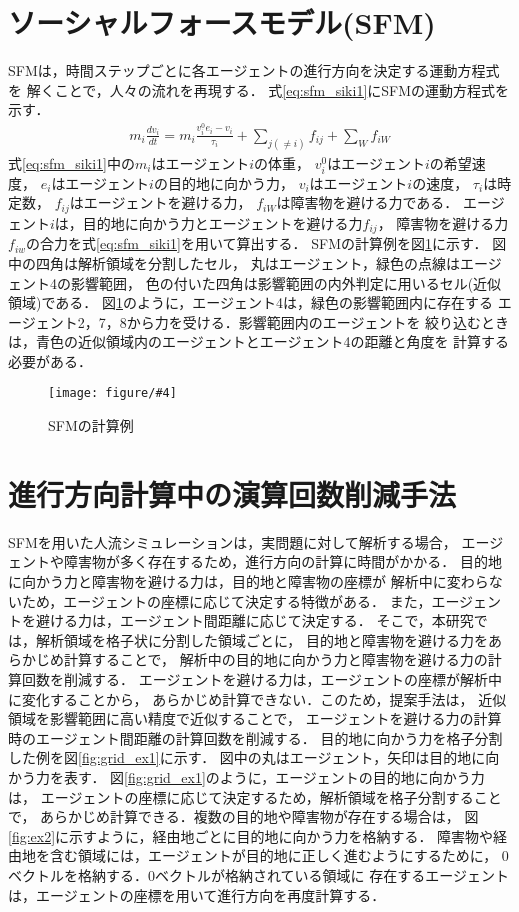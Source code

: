 \documentclass{maelab_y}
\newcommand{\figtb}[5]{ %
\begin{figure}[hbtp]
  \begin{center}
    \texttt{[image: figure/\#4]}
    \caption{#1}
    \label{fig:#5}
  \end{center}
\end{figure}
}%
\newcommand{\分類条件}{%
\begin{table}[t]
\begin{center}
\caption{進行方向を分類する条件}
\ecaption{Classification condition of moving direction $e_{i}$.}
\label{tb:hantei_jouken}
\begin{tabular}{c|c|c|c|c}
\hline \hline
			& 右 & 左 & 上 & 下 \\ \hline
パターン2   & $\frac{1}{\sqrt{2}} < e_x \leq 1  $
		    & $ -1 \leq e_x < \frac{-1}{\sqrt{2}}$ 
		    & $ \frac{-1}{\sqrt{2}} < e_x < \frac{1}{\sqrt{2}} $ 
		    & $ \frac{-1}{2} < e_x < \frac{1}{2} $ \\
パターン3   & $\frac{-1}{2} < e_y < \frac{1}{2} $ 
		    & $\frac{-1}{2} < e_y < \frac{1}{2} $
            & $ \frac{1}{\sqrt{2}} < e_y \leq 1$
		    & $ -1 \leq e_y < \frac{-1}{\sqrt{2}} $ \\
\hline
\multirow{2}{*}{パターン4}   
			& $R_x \geq A_x$ & $R_x < A_x$ & $R_y \geq A_y$ & $R_y < A_y $ \\
	        &  $L_x \geq A_x$ & $L_x < A_x$ & $L_y \geq A_y$ & $L_y < A_y$ \\
\hline
\multirow{2}{*}{パターン5}   
 			& $R_x \geq x_1$ & $R_x < x_2$ & $R_y \geq y_1$ & $R_y < y_2 $ \\
			& $L_x \geq x_1$ & $L_x < x_2$ & $L_y \geq y_1$ & $L_y < y_2 $ \\
\hline
パターン6   & $ \cos(\frac{1}{2}\theta_{view}) \leq  e_y $ 
			& $ e_y \leq -\cos(\frac{1}{2}\theta_{view})$ 
			& $ \sin(\frac{1}{2}(\pi - \theta_{view})) \leq e_x $ 
			& $ e_x \leq \sin(\frac{1}{2}(\pi - \theta_{view}))  $ \\
\hline
\end{tabular}
\end{center}
\end{table}}%
\newcommand{\距離計算new}{%
  \begin{table}[hbtp]
    \begin{center}
    \caption{エージェント間距離の計算回数[$10^{10}$回]}
    \label{tab:my-table}
    \begin{tabular}{c|llllll}
    \hline \hline
    \multirow{2}{*}{人数}   & \multicolumn{6}{c}{パターン}                                                                                                                                                             \\ \cline{2-7} 
                          & \multicolumn{1}{c|}{1}    & \multicolumn{1}{c|}{2}               & \multicolumn{1}{c|}{3}      & \multicolumn{1}{c|}{4}      & \multicolumn{1}{c|}{5}      & \multicolumn{1}{c}{6}    \\ \hline
    \multirow{2}{*}{3000} & \multicolumn{1}{r|}{5.1}  & \multicolumn{1}{r|}{\textbf{3.9}}    & \multicolumn{1}{r|}{4.0}    & \multicolumn{1}{r|}{4.4}    & \multicolumn{1}{r|}{4.1}    & \multicolumn{1}{r}{4.4}  \\
                          & \multicolumn{1}{l|}{}     & \multicolumn{1}{l|}{\textbf{(24\%)}} & \multicolumn{1}{l|}{(23\%)} & \multicolumn{1}{l|}{(15\%)} & \multicolumn{1}{l|}{(21\%)} & (15\%)                   \\ \hline
    \multirow{2}{*}{5000} & \multicolumn{1}{r|}{14.4} & \multicolumn{1}{r|}{\textbf{10.9}}   & \multicolumn{1}{r|}{11.1}   & \multicolumn{1}{r|}{12.2}   & \multicolumn{1}{r|}{11.4}   & \multicolumn{1}{r}{12.2} \\
                          & \multicolumn{1}{l|}{}     & \multicolumn{1}{l|}{\textbf{(24\%)}} & \multicolumn{1}{l|}{(23\%)} & \multicolumn{1}{l|}{(15\%)} & \multicolumn{1}{l|}{(21\%)} & (15\%)                   \\ \hline
    \multirow{2}{*}{7500} & \multicolumn{1}{r|}{33.1} & \multicolumn{1}{r|}{\textbf{25.2}}   & \multicolumn{1}{r|}{25.8}   & \multicolumn{1}{r|}{28.3}   & \multicolumn{1}{r|}{26.7}   & \multicolumn{1}{r}{28.3} \\
                          & \multicolumn{1}{l|}{}     & \multicolumn{1}{l|}{\textbf{(24\%)}} & \multicolumn{1}{l|}{(22\%)} & \multicolumn{1}{l|}{(15\%)} & \multicolumn{1}{l|}{(20\%)} & (15\%)                   \\ \hline
    \end{tabular}
    \end{center}
    \end{table}
}%
\newcommand{\粒子数}{%
\begin{table}[hbtp]
  \begin{center}
    \caption{各配置の詳細}
    \label{tb:haichi_para}
    \begin{tabular}{c|c|c}
      \hline \hline
      & 教室 & 演習室 \\ \hline 
      エージェント数[人] & 96 & 204 \\ \hline
      壁粒子数[個] & 1037 & 1454\\ \hline
      経由地数[個] & 12   & 26 \\ \hline
      解析領域 & $50m\times50m$ & $50m\times50m$ \\ \hline
    \end{tabular}
  \end{center}
\end{table}
}%
\newcommand{\評価環境}{%
\begin{table}[hbtp]
  \begin{center}
    \caption{各配置の詳細}
    \label{tb:haichi_para}
    \begin{tabular}{c|c|c}
      \hline \hline
                 & マシン1                & マシン2 \\ \hline 
      CPU        & Intel Xeon E5-2687W & Intel Xeon E5-2667W \\ \hline
      メモリ     & 64GB                   & 64GB \\ \hline
      OS         & Linux 4.12.9            & Linux 6.5.8 \\ \hline
      コンパイラ & gcc 7.2.0             & gcc 13.2.0 \\ \hline
    \end{tabular}
  \end{center}
\end{table}
}%
\begin{document}
\section{ソーシャルフォースモデル(SFM)}
SFMは，時間ステップごとに各エージェントの進行方向を決定する運動方程式を
解くことで，人々の流れを再現する．
式\eqref{eq:sfm_siki1}にSFMの運動方程式を示す．
%
\begin{align} \label{eq:sfm_siki1}
  m_i \frac{dv_i}{dt} = m_i \frac{v_i^0 e_i - v_i}{\tau_i}
  +\sum_{j(\neq i)}f_{ij}+\sum_{W}f_{iW}
\end{align}
%
式\eqref{eq:sfm_siki1}中の$m_i$はエージェント$i$の体重，
$v_i^0$はエージェント$i$の希望速度，
$e_i$はエージェント$i$の目的地に向かう力，
$v_i$はエージェント$i$の速度，
$\tau_i$は時定数，
$f_{ij}$はエージェントを避ける力，
$f_{iW}$は障害物を避ける力である．
エージェント$i$は，目的地に向かう力とエージェントを避ける力$f_{ij}$，
障害物を避ける力$f_{iw}$の合力を式\eqref{eq:sfm_siki1}を用いて算出する．
SFMの計算例を図\ref{fig:sfm_ex}に示す．
図中の四角は解析領域を分割したセル，
丸はエージェント，緑色の点線はエージェント4の影響範囲，
色の付いた四角は影響範囲の内外判定に用いるセル(近似領域)である．
図\ref{fig:sfm_ex}のように，エージェント4は，緑色の影響範囲内に存在する
エージェント2，7，8から力を受ける．影響範囲内のエージェントを
絞り込むときは，青色の近似領域内のエージェントとエージェント4の距離と角度を
計算する必要がある．

\figtb{SFMの計算例}{}{8}{20231226_sfm_ex.eps}{sfm_ex}

\section{進行方向計算中の演算回数削減手法}
SFMを用いた人流シミュレーションは，実問題に対して解析する場合，
エージェントや障害物が多く存在するため，進行方向の計算に時間がかかる．
目的地に向かう力と障害物を避ける力は，目的地と障害物の座標が
解析中に変わらないため，エージェントの座標に応じて決定する特徴がある．
また，エージェントを避ける力は，エージェント間距離に応じて決定する．
そこで，本研究では，解析領域を格子状に分割した領域ごとに，
目的地と障害物を避ける力をあらかじめ計算することで，
解析中の目的地に向かう力と障害物を避ける力の計算回数を削減する．
エージェントを避ける力は，エージェントの座標が解析中に変化することから，
あらかじめ計算できない．このため，提案手法は，
近似領域を影響範囲に高い精度で近似することで，
エージェントを避ける力の計算時のエージェント間距離の計算回数を削減する．
目的地に向かう力を格子分割した例を図\ref{fig:grid_ex1}に示す．
図中の丸はエージェント，矢印は目的地に向かう力を表す．
図\ref{fig:grid_ex1}のように，エージェントの目的地に向かう力は，
エージェントの座標に応じて決定するため，解析領域を格子分割することで，
あらかじめ計算できる．複数の目的地や障害物が存在する場合は，
図\ref{fig:ex2}に示すように，経由地ごとに目的地に向かう力を格納する．
障害物や経由地を含む領域には，エージェントが目的地に正しく進むようにするために，
0ベクトルを格納する．0ベクトルが格納されている領域に
存在するエージェントは，エージェントの座標を用いて進行方向を再度計算する．
\end{document}
